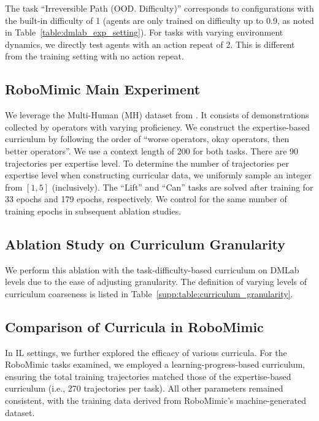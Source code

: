 The task ``Irreversible Path (OOD. Difficulty)'' corresponds to configurations with the built-in difficulty of 1 (agents are only trained on difficulty up to 0.9, as noted in Table~\ref{table:dmlab_exp_setting}).
For tasks with varying environment dynamics, we directly test agents with an action repeat of 2. This is different from the training setting with no action repeat.





\subsection{RoboMimic Main Experiment}
\label{supp:sec:robomimic_main}

We leverage the Multi-Human (MH) dataset from \citet{mandlekar2021matters}. It consists of demonstrations collected by operators with varying proficiency.
We construct the expertise-based curriculum by following the order of ``worse operators, okay operators, then better operators''.
We use a context length of 200 for both tasks. There are 90 trajectories per expertise level. To determine the number of trajectories per expertise level when constructing curricular data, we uniformly sample an integer from $[1, 5]$ (inclusively).
The ``Lift'' and ``Can'' tasks are solved after training for 33 epochs and 179 epochs, respectively.
We control for the same number of training epochs in subsequent ablation studies.

\subsection{Ablation Study on Curriculum Granularity}
\label{supp:sec:curriculum_granularity}

We perform this ablation with the task-difficulty-based curriculum on DMLab levels due to the ease of adjusting granularity.
The definition of varying levels of curriculum coarseness is listed in Table~\ref{supp:table:curriculum_granularity}.




\subsection{Comparison of Curricula in RoboMimic}
\label{supp:sec:curriculum_comparison}

In IL settings, we further explored the efficacy of various curricula. For the RoboMimic tasks examined, we employed a learning-progress-based curriculum, ensuring the total training trajectories matched those of the expertise-based curriculum (i.e., 270 trajectories per task). All other parameters remained consistent, with the training data derived from RoboMimic's machine-generated dataset.

